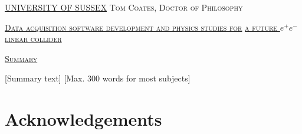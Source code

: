 \documentclass[a4paper,11pt]{report}
\newcommand{\linespacing}{1.5}
\renewcommand{\baselinestretch}{\linespacing}
\begin{document}
\thispagestyle{empty}
\newpage
\null\vskip10mm
\begin{center}
\large
\underline{UNIVERSITY OF SUSSEX}
\vskip20mm
\textsc{Tom Coates, Doctor of Philosophy}
\vskip20mm
\begin{center}
	\scshape
	\underline{Data acquisition software development and physics studies for}
	\underline{a future $e^+e^-$ linear collider}
\end{center}
\vskip0mm
\vskip20mm
\underline{\textsc{Summary}}
\vskip2mm
\end{center}
\renewcommand{\baselinestretch}{1.0}
\small\normalsize
[Summary text] [Max. 300 words for most subjects]

\chapter*{Acknowledgements}
\renewcommand{\baselinestretch}{\linespacing}
\small\normalsize

%


\newpage
{}
\tableofcontents

\newpage
{}











\end{document}
